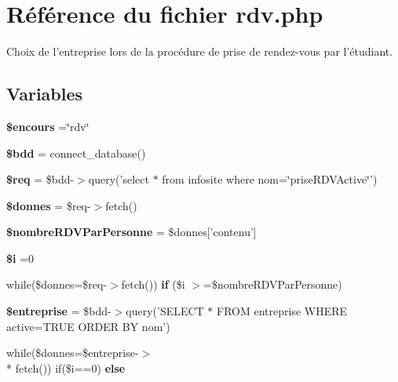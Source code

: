 \hypertarget{rdv_8php}{\section{Référence du fichier rdv.\-php}
\label{rdv_8php}
}


Choix de l'entreprise lors de la procédure de prise de rendez-\/vous par l'étudiant.  


\subsection*{Variables}
\begin{DoxyCompactItemize}
\item 
\hypertarget{rdv_8php_af7b0e56292699e6983c24fbbf70ce08d}{{\bfseries \$encours} =\char`\"{}rdv\char`\"{}}\label{rdv_8php_af7b0e56292699e6983c24fbbf70ce08d}

\item 
\hypertarget{rdv_8php_a94f91e878bce0991e2cd595c5dd79b3f}{{\bfseries \$bdd} = connect\-\_\-database()}\label{rdv_8php_a94f91e878bce0991e2cd595c5dd79b3f}

\item 
\hypertarget{rdv_8php_a63a7a283ea5dee8af1e2d5a3435bf370}{{\bfseries \$req} = \$bdd-\/$>$query('select $\ast$ from infosite where nom=\char`\"{}prise\-R\-D\-V\-Active\char`\"{}')}\label{rdv_8php_a63a7a283ea5dee8af1e2d5a3435bf370}

\item 
\hypertarget{rdv_8php_a93720f3d7a3eb4aabe4bb2053895b6b6}{{\bfseries \$donnes} = \$req-\/$>$fetch()}\label{rdv_8php_a93720f3d7a3eb4aabe4bb2053895b6b6}

\item 
\hypertarget{rdv_8php_aca8360b8df321ac8835d086335f18a12}{{\bfseries \$nombre\-R\-D\-V\-Par\-Personne} = \$donnes\mbox{[}'contenu'\mbox{]}}\label{rdv_8php_aca8360b8df321ac8835d086335f18a12}

\item 
\hypertarget{rdv_8php_a83018d9153d17d91fbcf3bc10158d34f}{{\bfseries \$i} =0}\label{rdv_8php_a83018d9153d17d91fbcf3bc10158d34f}

\item 
\hypertarget{rdv_8php_a14c4c4c77ecbb15064067e2fd1696b85}{while(\$donnes=\$req-\/$>$fetch()) {\bfseries if} (\$i $>$=\$nombre\-R\-D\-V\-Par\-Personne)}\label{rdv_8php_a14c4c4c77ecbb15064067e2fd1696b85}

\item 
\hypertarget{rdv_8php_a6d3423f147c69f4f47f014654a57fc93}{{\bfseries \$entreprise} = \$bdd-\/$>$query('S\-E\-L\-E\-C\-T $\ast$ F\-R\-O\-M entreprise W\-H\-E\-R\-E active=T\-R\-U\-E O\-R\-D\-E\-R B\-Y nom')}\label{rdv_8php_a6d3423f147c69f4f47f014654a57fc93}

\item 
while(\$donnes=\$entreprise-\/$>$\\*
fetch()) if(\$i==0) {\bfseries else}
\end{DoxyCompactItemize}


